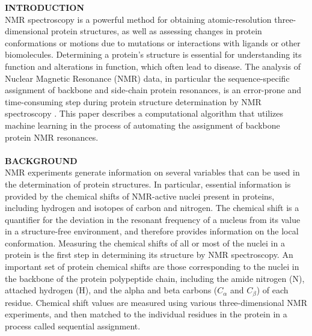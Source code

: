 \documentclass{article}
\begin{document}
\noindent \textbf{INTRODUCTION}\\
\indent NMR spectroscopy is a powerful method for obtaining atomic-resolution three-dimensional protein structures, as well as assessing changes in protein conformations or motions due to mutations or interactions with ligands or other biomolecules. Determining a protein's structure is essential for understanding its function and alterations in function, which often lead to disease. The analysis of Nuclear Magnetic Resonance (NMR) data, in particular the sequence-specific assignment of backbone and side-chain protein resonances, is an error-prone and time-consuming step during protein structure determination by NMR spectroscopy \cite{aria}. This paper describes a computational algorithm that utilizes machine learning in the process of automating the assignment of backbone protein NMR resonances.
\\\\
\noindent \textbf{BACKGROUND}\\
\indent NMR experiments generate information on several variables that can be used in the determination of protein structures. In particular, essential information is provided by the chemical shifts of NMR-active nuclei present in proteins, including hydrogen and isotopes of carbon and nitrogen. The chemical shift is a quantifier for the deviation in the resonant frequency of a nucleus from its value in a structure-free environment, and therefore provides information on the local conformation. Measuring the chemical shifts of all or most of the nuclei in a protein is the first step in determining its structure by NMR spectroscopy. An important set of protein chemical shifts are those corresponding to the nuclei in the backbone of the protein polypeptide chain, including the amide nitrogen (N), attached hydrogen (H), and the alpha and beta carbons ($C_{\alpha}$ and $C_{\beta}$) of each residue. Chemical shift values are measured using various three-dimensional NMR experiments, and then matched to the individual residues in the protein in a process called sequential assignment.	
			
\end{document}
